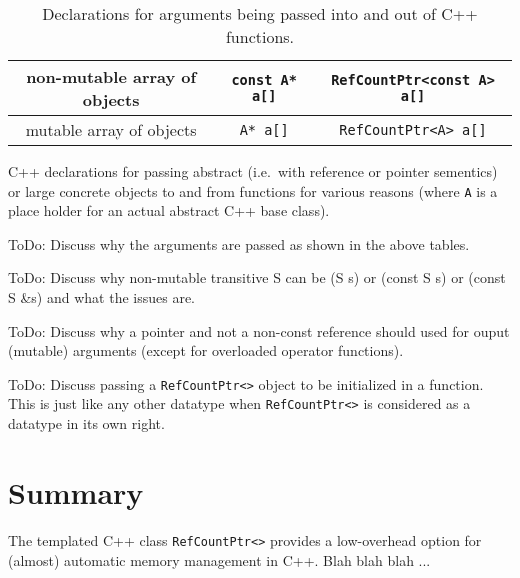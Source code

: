 \begin{table}
\begin{minipage}{\textwidth}
\begin{tabular}{|c|c|c|}
\hline
non-mutable array of objects
& \texttt{const A* a[]}
& \texttt{RefCountPtr<const A> a[]} \\
\hline
mutable array of objects
& \texttt{A* a[]}
& \texttt{RefCountPtr<A> a[]} \\
\hline
\end{tabular}
\begin{center}
C++ declarations for passing abstract (i.e.~with reference or pointer
sementics) or large concrete objects to and from functions for various
reasons (where \texttt{A} is a place holder for an actual abstract C++
base class).
\end{center}
\end{minipage}
%
\caption{\label{rcp:tbl:fnc-decl}Declarations for arguments being
passed into and out of C++ functions.}
%
\end{table}

ToDo: Discuss why the arguments are passed as shown in the above
tables.

ToDo: Discuss why non-mutable transitive S can be (S s) or (const S s)
or (const S \&s) and what the issues are.

ToDo: Discuss why a pointer and not a non-const reference should used
for ouput (mutable) arguments (except for overloaded operator
functions).

ToDo: Discuss passing a \texttt{RefCountPtr<>} object to be
initialized in a function.  This is just like any other datatype when
\texttt{RefCountPtr<>} is considered as a datatype in its own right.

%
\section{Summary}
%

The templated C++ class \texttt{RefCountPtr<>} provides a low-overhead
option for (almost) automatic memory management in C++.  Blah blah
blah ...
